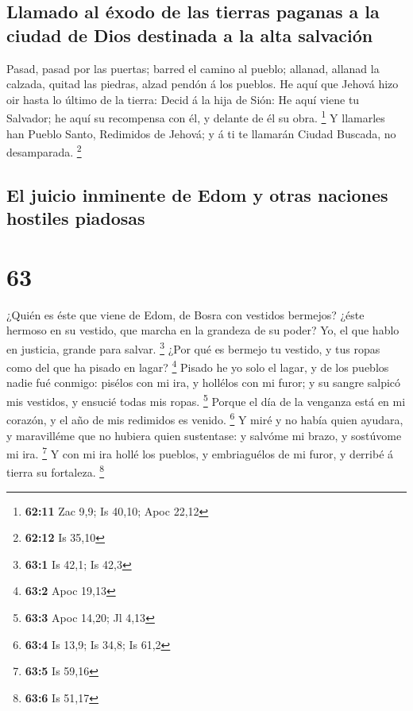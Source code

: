 \hypertarget{llamado-al-uxe9xodo-de-las-tierras-paganas-a-la-ciudad-de-dios-destinada-a-la-alta-salvaciuxf3n}{%
\subsection{Llamado al éxodo de las tierras paganas a la ciudad de Dios
destinada a la alta
salvación}\label{llamado-al-uxe9xodo-de-las-tierras-paganas-a-la-ciudad-de-dios-destinada-a-la-alta-salvaciuxf3n}}

 Pasad, pasad por las puertas; barred el camino al pueblo;
allanad, allanad la calzada, quitad las piedras, alzad pendón á los
pueblos.  He aquí que Jehová hizo oir hasta lo último de la
tierra: Decid á la hija de Sión: He aquí viene tu Salvador; he aquí su
recompensa con él, y delante de él su obra. \footnote{\textbf{62:11} Zac
  9,9; Is 40,10; Apoc 22,12}  Y llamarles han Pueblo Santo,
Redimidos de Jehová; y á ti te llamarán Ciudad Buscada, no desamparada.
\footnote{\textbf{62:12} Is 35,10}

\hypertarget{el-juicio-inminente-de-edom-y-otras-naciones-hostiles-piadosas}{%
\subsection{El juicio inminente de Edom y otras naciones hostiles
piadosas}\label{el-juicio-inminente-de-edom-y-otras-naciones-hostiles-piadosas}}

\hypertarget{section-62}{%
\section{63}\label{section-62}}

 ¿Quién es éste que viene de Edom, de Bosra con vestidos
bermejos? ¿éste hermoso en su vestido, que marcha en la grandeza de su
poder? Yo, el que hablo en justicia, grande para salvar. \footnote{\textbf{63:1}
  Is 42,1; Is 42,3}  ¿Por qué es bermejo tu vestido, y tus
ropas como del que ha pisado en lagar? \footnote{\textbf{63:2} Apoc
  19,13}  Pisado he yo solo el lagar, y de los pueblos nadie
fué conmigo: pisélos con mi ira, y hollélos con mi furor; y su sangre
salpicó mis vestidos, y ensucié todas mis ropas. \footnote{\textbf{63:3}
  Apoc 14,20; Jl 4,13}  Porque el día de la venganza está en
mi corazón, y el año de mis redimidos es venido. \footnote{\textbf{63:4}
  Is 13,9; Is 34,8; Is 61,2}  Y miré y no había quien
ayudara, y maravilléme que no hubiera quien sustentase: y salvóme mi
brazo, y sostúvome mi ira. \footnote{\textbf{63:5} Is 59,16}
 Y con mi ira hollé los pueblos, y embriaguélos de mi furor,
y derribé á tierra su fortaleza. \footnote{\textbf{63:6} Is 51,17}

